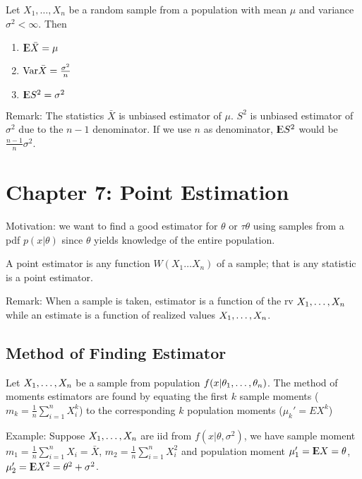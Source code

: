 \documentclass[12pt]{article}
\begin{document}
\begin{theorem}
	Let $X_1,\ldots, X_n$ be a random sample from a population with mean $\mu$ and variance $\sigma^2 < \infty$. Then
	\begin{enumerate}
		\item ${\rm I\kern-.3em E}\bar{X} = \mu$
		\item $\mathrm{Var} \bar{X} = \frac{\sigma^2}{n}$
		\item ${\rm I\kern-.3em E} S^2 = \sigma^2$
	\end{enumerate}
Remark: The statistics $\bar{X}$ is unbiased estimator of $\mu$. $S^2$ is unbiased estimator of $\sigma^2$ due to the $n-1$ denominator. If we use $n$ as denominator, ${\rm I\kern-.3em E} S^2$ would be $\frac{n-1}{n} \sigma^2$.
\end{theorem}
	
\section*{Chapter 7: Point Estimation}
Motivation: we want to find a good estimator for $\theta$ or $\tau{\theta}$ using samples from a pdf $p(x |\theta)$ since $\theta$ yields knowledge of the entire population.
	
\begin{definition}
	A point estimator is any function $W(X_1 \ldots X_n)$ of a sample; that is any statistic is a point estimator.
\end{definition}
Remark: When a sample is taken, estimator is a function of the rv $X_1,\ldots, X_n$ while an estimate is a function of realized values $X_1,\ldots, X_n$.

\subsection*{Method of Finding Estimator}

\begin{theorem}
	Let $X_1,\ldots, X_n$ be a sample from population $f(x|\theta_1,\ldots, \theta_n)$. The method of moments estimators are found by equating the first $k$ sample moments ($m_k = \frac{1}{n}\sum^n_{i=1}X_i^k$) to the corresponding $k$ population moments ($\mu_k' = EX^k$)
\end{theorem}

Example: Suppose $X_1,\ldots, X_n$ are iid from $f(x|\theta, \sigma^2)$, we have sample moment $m_1 = \frac{1}{n}\sum^n_{i=1}X_i = \bar{X}$, $m_2 = \frac{1}{n} \sum^n_{i=1}X_i^2$ and population moment $\mu_1' = {\rm I\kern-.3em E} X = \theta$,  $\mu_2' = {\rm I\kern-.3em E} X^2 = \theta^2 + \sigma^2$.
\end{document}
